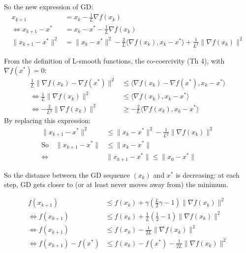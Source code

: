 So the new expression of GD:
\begin{align*}
x_{k+1}&=x_k-\frac{1}{L}\nabla f(x_k)\\
\iff x_{k+1}-x^*&=x_k-x^*-\frac{1}{L}\nabla f(x_k)\\
\lVert x_{k+1}-x^*\rVert^2&=\lVert x_k-x^*\rVert^2-\frac{2}{L}\bigl\langle\nabla f(x_k),x_k-x^*\bigr\rangle+\frac{1}{L^2}\lVert\nabla f(x_k)\rVert^2
\end{align*}

From the definition of L-smooth functions, the co-coercivity (Th 4), with $\nabla f(x^*)=0$:
\begin{align*}
\frac{1}{L}\lVert\nabla f(x_k)-\nabla f(x^*)\rVert^2&\le\bigl\langle\nabla f(x_k)-\nabla f(x^*),x_k-x^*\bigr\rangle\\
\iff\frac{1}{L}\lVert\nabla f(x_k)\rVert^2&\le\bigl\langle\nabla f(x_k),x_k-x^*\bigr\rangle\\
\iff -\frac{2}{L^2}\lVert\nabla f(x_k)\rVert^2&\ge-\frac{2}{L}\bigl\langle\nabla f(x_k),x_k-x^*\bigr\rangle
\end{align*}
By replacing this expression:
\begin{align*}
\lVert x_{k+1}-x^*\rVert^2&\le\lVert x_k-x^*\rVert^2-\frac{1}{L^2}\lVert\nabla f(x_k)\rVert^2\\
\text{So}\quad\lVert x_{k+1}-x^*\rVert&\le\lVert x_k-x^*\rVert\\
\iff\ &\boxed{\lVert x_{k+1}-x^*\rVert\le\lVert x_0-x^*\rVert}
\end{align*}

So the distance between the GD sequence $(x_k)$ and $x^*$ is decreasing: at each step, GD gets closer to (or at least never moves away from) the minimum.

\begin{align*}
f(x_{k+1})&\le f(x_k)+\gamma\left(\frac{L}{2}\gamma-1\right)\lVert\nabla f(x_k)\rVert^2\\
\iff f(x_{k+1})&\le f(x_k)+\frac{1}{L}\left(\frac12-1\right)\lVert\nabla f(x_k)\rVert^2\\
\iff f(x_{k+1})&\le f(x_k)-\frac{1}{2L}\lVert\nabla f(x_k)\rVert^2\\
\iff f(x_{k+1})-f(x^*)&\le f(x_k)-f(x^*)-\frac{1}{2L}\lVert\nabla f(x_k)\rVert^2
\end{align*}

